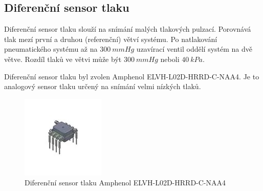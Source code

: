 \subsection{Diferenční sensor tlaku} \label{section:diff_pressure_sen}
Diferenční sensor tlaku slouží na snímání malých tlakových pulzací. Porovnává tlak mezí první a druhou (referenční) větví systému. Po natlakování pneumatického systému až na $300 \ mmHg$ uzavírací ventil oddělí systém na dvě větve. Rozdíl tlaků ve větvi může být $300 \ mmHg$ neboli $40 \ kPa$. \par
Diferenční sensor tlaku byl zvolen Amphenol ELVH-L02D-HRRD-C-NAA4. Je to analogový sensor tlaku určený na snímání velmi nízkých tlaků.
\begin{figure}[H]
    \centering
    \includegraphics[width=0.4\linewidth]{pictures/amphenol.jpg}
    \caption{Diferenční sensor tlaku Amphenol ELVH-L02D-HRRD-C-NAA4 \cite{cite:Allsensors}}
    \label{fig:amphenol}
\end{figure}


